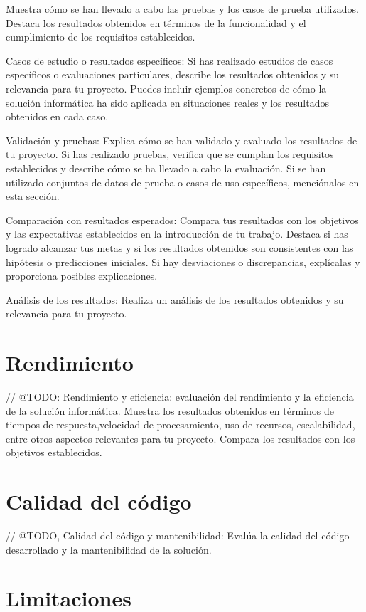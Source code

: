 Muestra cómo se han llevado a cabo las pruebas y los casos de prueba utilizados.
Destaca los resultados obtenidos en términos de la funcionalidad y el cumplimiento de los requisitos establecidos.

Casos de estudio o resultados específicos: Si has realizado estudios de casos específicos o evaluaciones particulares,
describe los resultados obtenidos y su relevancia para tu proyecto.
Puedes incluir ejemplos concretos de cómo la solución informática ha sido aplicada en situaciones reales y los
resultados obtenidos en cada caso.

Validación y pruebas: Explica cómo se han validado y evaluado los resultados de tu proyecto.
Si has realizado pruebas, verifica que se cumplan los requisitos establecidos y describe cómo se ha llevado a cabo la
evaluación.
Si se han utilizado conjuntos de datos de prueba o casos de uso específicos, menciónalos en esta sección.

Comparación con resultados esperados: Compara tus resultados con los objetivos
y las expectativas establecidos en la introducción de tu trabajo.
Destaca si has logrado alcanzar tus metas y si los resultados obtenidos son consistentes con las hipótesis o
predicciones iniciales.
Si hay desviaciones o discrepancias, explícalas y proporciona posibles explicaciones.

Análisis de los resultados: Realiza un análisis de los resultados obtenidos y su relevancia para tu proyecto.


\section{Rendimiento}

// @TODO: Rendimiento y eficiencia: evaluación del rendimiento y la eficiencia de la solución informática.
Muestra los resultados obtenidos en términos de tiempos de respuesta,velocidad de procesamiento, uso de recursos,
escalabilidad, entre otros aspectos relevantes para tu proyecto.
Compara los resultados con los objetivos establecidos.


\section{Calidad del código}

// @TODO, Calidad del código y mantenibilidad:
Evalúa la calidad del código desarrollado y la mantenibilidad de la solución.


\section{Limitaciones}

